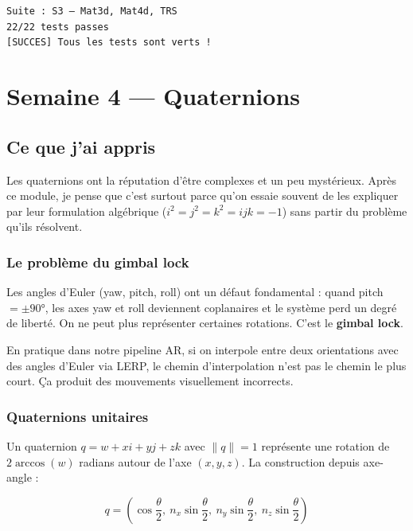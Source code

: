\documentclass[12pt,a4paper]{report}
\begin{document}
\begin{resultbox}
\texttt{Suite : S3 — Mat3d, Mat4d, TRS} \\
\texttt{22/22 tests passes} \\
\texttt{[SUCCES] Tous les tests sont verts !}
\end{resultbox}

\chapter{Semaine 4 — Quaternions}

\section{Ce que j'ai appris}

Les quaternions ont la réputation d'être complexes et un peu mystérieux. Après ce module, je pense que c'est surtout parce qu'on essaie souvent de les expliquer par leur formulation algébrique ($i^2 = j^2 = k^2 = ijk = -1$) sans partir du problème qu'ils résolvent.

\subsection{Le problème du gimbal lock}

Les angles d'Euler (yaw, pitch, roll) ont un défaut fondamental : quand pitch $= \pm 90°$, les axes yaw et roll deviennent coplanaires et le système perd un degré de liberté. On ne peut plus représenter certaines rotations. C'est le \textbf{gimbal lock}.

En pratique dans notre pipeline AR, si on interpole entre deux orientations avec des angles d'Euler via LERP, le chemin d'interpolation n'est pas le chemin le plus court. Ça produit des mouvements visuellement incorrects.

\subsection{Quaternions unitaires}

Un quaternion $q = w + xi + yj + zk$ avec $\|q\| = 1$ représente une rotation de $2 \arccos(w)$ radians autour de l'axe $(x, y, z)$. La construction depuis axe-angle :

$$
q = \left(\cos\frac{\theta}{2},\ n_x \sin\frac{\theta}{2},\ n_y \sin\frac{\theta}{2},\ n_z \sin\frac{\theta}{2}\right)
$$
\end{document}

